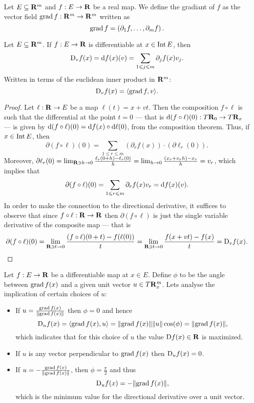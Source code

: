 \begin{definition}[Gradiant]
  Let \(E \subseteq \mathbf{R}^m\) and \(f: E \to \mathbf{R}\) be a real map. We define the
  gradiant of \(f\) as the vector field \(\operatorname{grad} f: \mathbf{R}^m \to \mathbf{R}^m\) written as
  \[
    \operatorname{grad} f = \left( \partial_1 f, \dots, \partial_m f \right).
  \]
\end{definition}

\begin{corollary}
  Let \(E \subseteq \mathbf{R}^m\). If \(f: E \to \mathbf{R}\) is differentiable at \(x \in \operatorname{Int}
  E\), then
  \[
    \mathrm{D}_v f(x) = \mathrm{d} f(x)(v) = \sum_{1 \leqslant j \leqslant m} \partial_j f(x) v_j.
  \]
  Written in terms of the euclidean inner product in \(\mathbf{R}^m\):
  \[
    \mathrm{D}_v f(x) = \langle \operatorname{grad} f, v \rangle.
  \]
\end{corollary}

\begin{proof}
  Let \(\ell: \mathbf{R} \to E\) be a map \(\ell(t) = x + v t\). Then the composition
  \(f \circ \ell\) is such that the differential at the point \(t = 0\) --- that
  is \(\mathrm{d} (f \circ \ell)(0): T\mathbf{R}_0 \to T\mathbf{R}_x\) --- is given by \(\mathrm{d} (f
  \circ \ell)(0) = \mathrm{d} f(x) \circ \mathrm{d} \ell(0)\), from the composition
  theorem. Thus, if \(x \in \operatorname{Int} E\), then
  \[
    \partial (f \circ \ell)(0) =
    \sum_{1 \leq r \leq m}
    (\partial_r f(x)) \cdot (\partial \ell_r(0)).
  \]
  Moreover, \(\partial \ell_r(0) = \lim_{\mathbf{R} \ni h \to 0} \frac{\ell_r(0 + h) -
  \ell_r(0)}{h}  = \lim_{h \to 0} \frac{(x_r + v_r h) - x_r}{h} = v_r\), which
  implies that
  \[
    \partial (f\circ \ell)(0) = \sum_{1 \leqslant r \leqslant m} \partial_r f(x) v_r =
    \mathrm{d} f(x)(v).
  \]
  In order to make the connection to the directional derivative, it suffices to
  observe that since \(f \circ \ell: \mathbf{R} \to \mathbf{R}\) then \(\partial (f \circ
  \ell)\) is just the single variable derivative of the composite map ---
  that is
  \[
    \partial (f \circ \ell)(0) =
    \lim_{\mathbf{R} \ni t \to 0} \frac{(f \circ \ell)(0 + t) - f(\ell(0))} t =
    \lim_{\mathbf{R} \ni t \to 0} \frac{f(x + vt) - f(x)} t = \mathrm{D}_v f(x).
  \]
\end{proof}

Let \(f: E \to \mathbf{R}\) be a differentiable map at \(x \in E\). Define \(\phi\) to
be the angle between \(\operatorname{grad} f(x)\) and a given unit vector \(u \in T\mathbf{R}^m_x\).
Lets analyse the implication of certain choices of \(u\):
\begin{itemize}
  \item If \(u = \frac{\operatorname{grad} f(x)}{\lVert\operatorname{grad} f(x)\rVert}\) then \(\phi = 0\) and
    hence
    \[
      \mathrm{D}_u f(x) = \langle \operatorname{grad} f(x), u \rangle = \lVert\operatorname{grad} f(x)\rVert \lVert u\rVert
      \cos(\phi) = \lVert\operatorname{grad} f(x)\rVert,
    \]
    which indicates that for this choice of \(u\) the value \(\mathrm{D} f(x) \in
    \mathbf{R}\) is maximized.
  \item If \(u\) is any vector perpendicular to \(\operatorname{grad} f(x)\) then \(\mathrm{D}_u
    f(x) = 0\).
  \item If \(u = - \frac{\operatorname{grad} f(x)}{\lVert\operatorname{grad} f(x)\rVert}\), then \(\phi = \frac
    \pi 2\) and thus
    \[
      \mathrm{D}_u f(x) = -\lVert\operatorname{grad} f(x)\rVert,
    \]
    which is the minimum value for the directional derivative over a unit
    vector.
\end{itemize}

